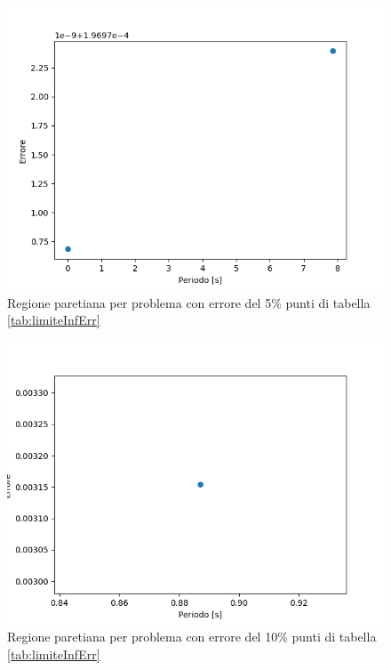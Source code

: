 \documentclass[a4paper,12pt]{report}
\begin{document}
\begin{itemize}
      \begin{figure}[H]
        \centering
        \includegraphics[scale=0.70]{img/puls08/standard10_err5.png}
        \caption{Regione paretiana per problema con errore del 5\% punti di tabella \ref{tab:limiteInfErr}}
        \label{fig:reg_ammis_20_5_std_err}
      \end{figure}

      \begin{figure}[H]
        \centering
        \includegraphics[scale=0.70]{img/puls08/standard10_err10.png}
        \caption{Regione paretiana per problema con errore del 10\% punti di tabella \ref{tab:limiteInfErr}}
        \label{fig:reg_ammis_10_08_std_err}
      \end{figure}


\end{itemize}
\end{document}
